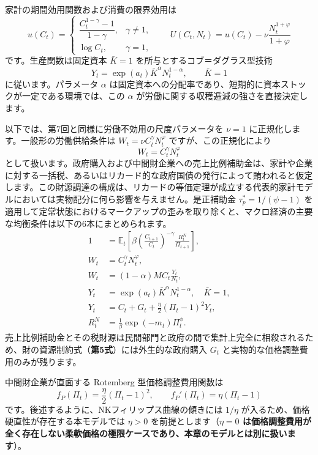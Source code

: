 \documentclass[
  japanese,
  lualatex,
  ja=standard,
  12pt,
  a4paper]{ltjsarticle}
\begin{document}
家計の期間効用関数および消費の限界効用は \[
u(C_t)
=
\begin{cases}
\dfrac{C_t^{1-\gamma}-1}{1-\gamma}, & \gamma\neq1,\\[6pt]
\log C_t, & \gamma=1,
\end{cases}
\qquad
U(C_t,N_t)=u(C_t)-\nu\frac{N_t^{1+\varphi}}{1+\varphi}
\] です。生産関数は固定資本 \(\bar{K}=1\)
を所与とするコブ＝ダグラス型技術 \[
Y_t=\exp(a_t)\bar K^\alpha N_t^{1-\alpha},
\qquad
\bar K=1
\] に従います。パラメータ \(\alpha\)
は固定資本への分配率であり、短期的に資本ストックが一定である環境では、この
\(\alpha\) が労働に関する収穫逓減の強さを直接決定します。

以下では、第7回と同様に労働不効用の尺度パラメータを \(\nu=1\)
に正規化します。一般形の労働供給条件は
\(W_t=\nu C_t^\gamma N_t^\varphi\) ですが、この正規化により \[
W_t=C_t^\gamma N_t^\varphi
\]
として扱います。政府購入および中間財企業への売上比例補助金は、家計や企業に対する一括税、あるいはリカード的な政府国債の発行によって賄われると仮定します。この財源調達の構成は、リカードの等価定理が成立する代表的家計モデルにおいては実物配分に何ら影響を与えません。是正補助金
\(\tau_p^*=1/(\psi-1)\)
を適用して定常状態におけるマークアップの歪みを取り除くと、マクロ経済の主要な均衡条件は以下の6本にまとめられます。
\[
\begin{aligned}
1&=\mathbb{E}_t\left[
\beta\left(\frac{C_{t+1}}{C_t}\right)^{-\gamma}
\frac{R_t^N}{\Pi_{t+1}}
\right],\\
W_t&=C_t^\gamma N_t^\varphi,\\
W_t&=(1-\alpha)MC_t\frac{Y_t}{N_t},\\
Y_t&=\exp(a_t)\bar K^\alpha N_t^{1-\alpha},\quad \bar K=1,\\
Y_t&=C_t+G_t+\frac{\eta}{2}(\Pi_t-1)^2Y_t,\\
R_t^N&=\frac{1}{\beta}\exp(-m_t)\Pi_t^\phi.
\end{aligned}
\]
売上比例補助金とその税財源は民間部門と政府の間で集計上完全に相殺されるため、財の資源制約式（\textbf{第5式}）には外生的な政府購入
\(G_t\) と実物的な価格調整費用のみが残ります。

\Needspace{0.20\textheight}

中間財企業が直面する Rotemberg 型価格調整費用関数は \[
f_P(\Pi_t)=\frac{\eta}{2}(\Pi_t-1)^2,
\qquad
f_P'(\Pi_t)=\eta(\Pi_t-1)
\] です。後述するように、NKフィリップス曲線の傾きには \(1/\eta\)
が入るため、価格硬直性が存在する本モデルでは \(\eta>0\)
を前提とします（\textbf{\(\eta=0\)
は価格調整費用が全く存在しない柔軟価格の極限ケースであり、本章のモデルとは別に扱います}）。
\end{document}
